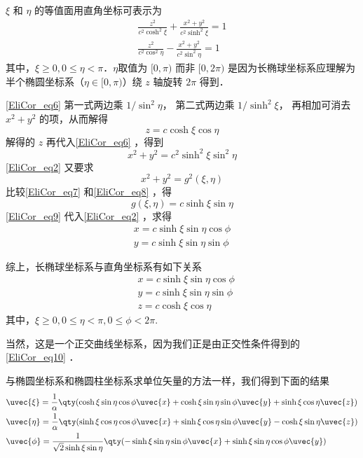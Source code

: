 $\xi$ 和 $\eta$ 的等值面用直角坐标可表示为
\begin{equation}\label{EliCor_eq6}
\begin{aligned}
\frac{z^2}{c^2\cosh^2\xi}+\frac{x^2+y^2}{c^2\sinh^2\xi}=1\\
\frac{z^2}{c^2\cos^2\eta}-\frac{x^2+y^2}{c^2\sin^2\eta}=1
\end{aligned}
\end{equation}
其中，$\xi\geq 0,0\leq\eta<\pi$．$\eta$取值为 $[0,\pi)$ 而非 $[0,2\pi)$ 是因为长椭球坐标系应理解为半个椭圆坐标系（$\eta\in[0,\pi)$）绕 $z$ 轴旋转 $2\pi$ 得到．

\autoref{EliCor_eq6} 第一式两边乘 $1/\sin^2\eta$， 第二式两边乘 $1/\sinh^2\xi$， 再相加可消去 $x^2+y^2$ 的项，从而解得
\begin{equation}
z=c\cosh\xi\cos\eta
\end{equation}
解得的 $z$ 再代入\autoref{EliCor_eq6} ，得到
\begin{equation}\label{EliCor_eq7}
x^2+y^2=c^2\sinh^2\xi\sin^2\eta
\end{equation}
\autoref{EliCor_eq2} 又要求
\begin{equation}\label{EliCor_eq8}
x^2+y^2=g^2(\xi,\eta)
\end{equation}
比较\autoref{EliCor_eq7} 和\autoref{EliCor_eq8} ，得
\begin{equation}\label{EliCor_eq9}
g(\xi,\eta)=c\sinh\xi\sin\eta
\end{equation}
\autoref{EliCor_eq9} 代入\autoref{EliCor_eq2} ，求得
\begin{equation}
\begin{aligned}
x=c\sinh\xi\sin\eta\cos\phi\\
y=c\sinh\xi\sin\eta\sin\phi
\end{aligned}
\end{equation}

综上，长椭球坐标系与直角坐标系有如下关系
\begin{equation}\label{EliCor_eq10}
\begin{aligned}
&x=c\sinh\xi\sin\eta\cos\phi\\
&y=c\sinh\xi\sin\eta\sin\phi\\
&z=c\cosh\xi\cos\eta
\end{aligned}
\end{equation}
其中，$\xi\geq 0,0\leq\eta<\pi,0\leq\phi<2\pi$.

当然，这是一个正交曲线坐标系，因为我们正是由正交性条件得到的\autoref{EliCor_eq10} ．

与椭圆坐标系和椭圆柱坐标系求单位矢量的方法一样，我们得到下面的结果
\begin{equation}
\begin{aligned}
&\uvec{\xi}=\frac{1}{\alpha}\qty(\cosh\xi\sin\eta\cos\phi\uvec{x}+\cosh\xi\sin\eta\sin\phi\uvec{y}+\sinh\xi\cos\eta\uvec{z})\\
&\uvec{\eta}=\frac{1}{\alpha}\qty(\sinh\xi\cos\eta\cos\phi\uvec{x}+\sinh\xi\cos\eta\sin\phi\uvec{y}-\cosh\xi\sin\eta\uvec{z})\\
&\uvec{\phi}=\frac{1}{\sqrt{2}\sinh\xi\sin\eta}\qty(-\sinh\xi\sin\eta\sin\phi\uvec{x}+\sinh\xi\sin\eta\cos\phi\uvec{y})
\end{aligned}
\end{equation}
